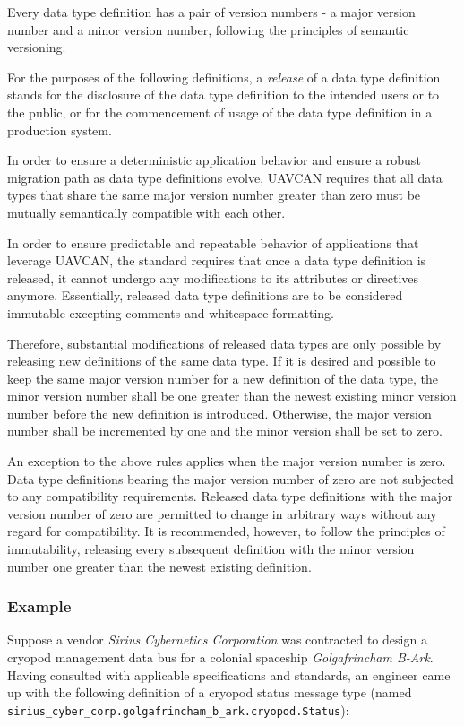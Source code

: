 Every data type definition has a pair of version numbers -
a major version number and a minor version number, following the principles of semantic versioning.

For the purposes of the following definitions, a \emph{release} of a data type definition stands for
the disclosure of the data type definition to the intended users or to the public,
or for the commencement of usage of the data type definition in a production system.

In order to ensure a deterministic application behavior and ensure a robust migration path
as data type definitions evolve, UAVCAN requires that all data types that share the same major version number
greater than zero must be mutually semantically compatible with each other.

In order to ensure predictable and repeatable behavior of applications that leverage UAVCAN,
the standard requires that once a data type definition is released, it cannot undergo any modifications to
its attributes or directives anymore.
Essentially, released data type definitions are to be considered immutable excepting
comments and whitespace formatting.

Therefore, substantial modifications of released data types are only possible by releasing
new definitions of the same data type.
If it is desired and possible to keep the same major version number for a new definition of the data type,
the minor version number shall be one greater than the newest existing minor version
number before the new definition is introduced.
Otherwise, the major version number shall be incremented by one and the minor version shall be set to zero.

An exception to the above rules applies when the major version number is zero.
Data type definitions bearing the major version number of zero are not subjected to any compatibility requirements.
Released data type definitions with the major version number of zero are permitted to change in arbitrary
ways without any regard for compatibility.
It is recommended, however, to follow the principles of immutability, releasing every subsequent definition
with the minor version number one greater than the newest existing definition.

\subsubsection{Example}

Suppose a vendor \emph{Sirius Cybernetics Corporation} was contracted to design a cryopod management data bus for a
colonial spaceship \emph{Golgafrincham B-Ark}.
Having consulted with applicable specifications and standards, an engineer came up with the following
definition of a cryopod status message type (named \verb|sirius_cyber_corp.golgafrincham_b_ark.cryopod.Status|):

